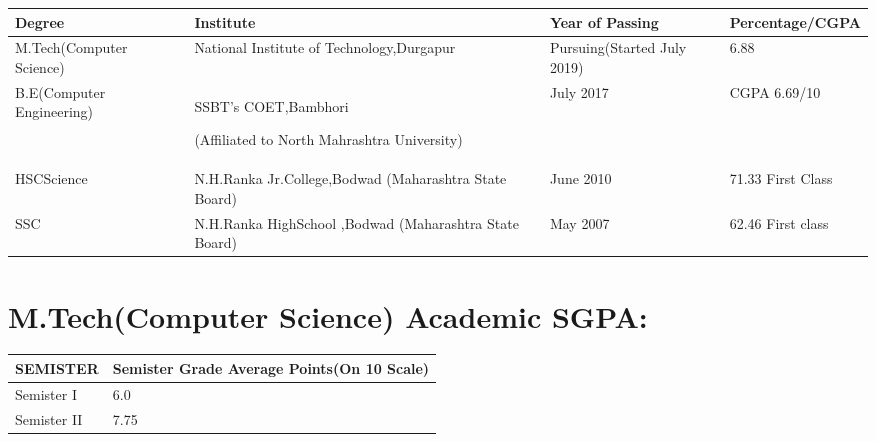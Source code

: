\documentclass[a4paper,10pt]{article}
\begin{document}
\begin{center}
\begin{tabular}{ | m{2.0cm} | m{7.0cm}| m{3.5cm} | m{3cm} | } 
\hline
\textbf{Degree} & \textbf{Institute}    & \textbf{Year of Passing}  & \textbf{Percentage/CGPA }  \\ 
\hline
M.Tech\newline(Computer Science)  & National Institute of Technology,Durgapur  & Pursuing(Started July 2019) & 6.88\\


\hline
B.E\newline(Computer Engineering) & SSBT’s COET,Bambhori\newline

{\small (Affiliated to North Mahrashtra University)}   & July 2017  & CGPA 6.69/10 \\

\hline
HSC\newline Science  & N.H.Ranka Jr.College,Bodwad\newline
{\small (Maharashtra State Board)}& June 2010 & 71.33 First Class \\

\hline
SSC & N.H.Ranka HighSchool ,Bodwad\newline
{\small (Maharashtra State Board)}
  & May 2007 & 62.46 First class \\ 
\hline
\end{tabular}
\end{center}



\vspace{5mm}


\section{M.Tech(Computer Science) Academic SGPA:}

\begin{tabu} to 0.8\textwidth { | X[l] | X[l] |  }
 \hline
 
 \Large
 SEMISTER  & \Large
  Semister Grade Average Points(On 10 Scale)   \\
\hline
\large Semister I & 6.0   \\
 \hline
 \large Semister II & 7.75  \\
 \hline

\end{tabu}
\end{document}
